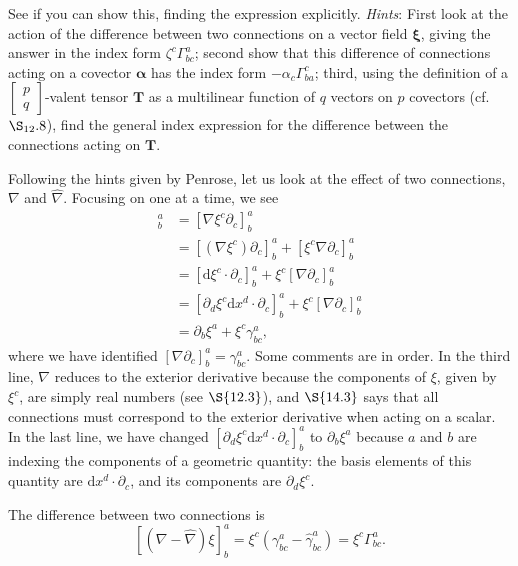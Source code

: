 \documentclass[../the-road-to-reality.tex]{subfiles}
\begin{document}
\begin{questions}
	\question See if you can show this, finding the expression explicitly. \textit{Hints}:  First look at the action of the difference between two connections on a vector field $\mathbf{\xi}$, giving the answer in the index form $\zeta^c\Gamma^a_{bc}$; second show that this difference of connections acting on a covector $\mathbf{\alpha}$ has the index form $-\alpha_c\Gamma^c_{ba}$; third, using the definition of a $\begin{bmatrix} p \\ q \end{bmatrix}$-valent tensor $\mathbf{T}$ as a multilinear function of $q$ vectors on $p$ covectors (cf. $\S_{12}.8$), find the general index expression for the difference between the connections acting on $\mathbf{T}$.

	\begin{solution}
		Following the hints given by Penrose, let us look at the effect of two connections, $\nabla$ and $\hat{\nabla}$. Focusing on one at a time, we see
		\begin{align*}
			[\nabla\xi]^a_b &= [\nabla\xi^c\partial_c]^a_b \\
					&= [(\nabla\xi^c)\partial_c]^a_b + [\xi^c\nabla\partial_c]^a_b \\
					&= [\mathrm{d}\xi^c\cdot\partial_c]^a_b + \xi^c[\nabla\partial_c]^a_b \\
					&= [\partial_d\xi^c\mathrm{d}x^d\cdot\partial_c]^a_b + \xi^c[\nabla\partial_c]^a_b \\
					&= \partial_b\xi^a + \xi^c\gamma^a_{bc}
		,\end{align*}
		where we have identified $[\nabla\partial_c]^a_b = \gamma^a_{bc}$. Some comments are in order. In the third line, $\nabla$ reduces to the exterior derivative because the components of $\xi$, given by $\xi^c$, are simply real numbers (see $\S{12.3}$), and $\S{14.3}$ says that all connections must correspond to the exterior derivative when acting on a scalar. In the last line, we have changed $[\partial_d\xi^c\mathrm{d}x^d\cdot\partial_c]^a_b$ to $\partial_b\xi^a$ because $a$ and $b$ are indexing the components of a geometric quantity: the basis elements of this quantity are $\mathrm{d}x^d\cdot\partial_c$, and its components are $\partial_d\xi^c$.

		The difference between two connections is
		\[
			[(\nabla -\hat{\nabla})\xi]^a_b = \xi^c(\gamma^a_{bc} - \hat{\gamma}^a_{bc}) = \xi^c\Gamma^a_{bc}
		.\] 


\end{solution}
\end{questions}
\end{document}
